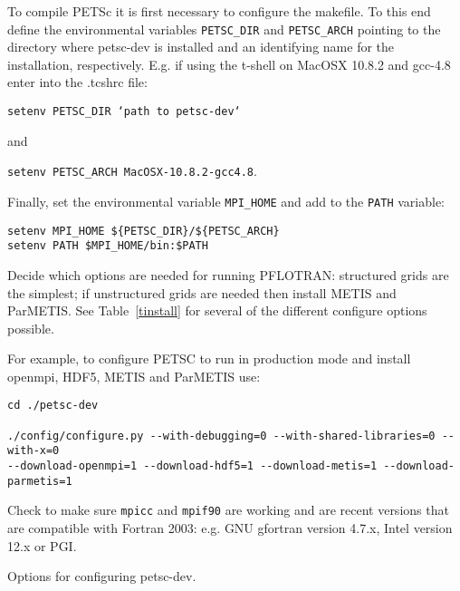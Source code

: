 \begin{description}
To compile PETSc it is first necessary to configure the makefile. To this end define the environmental variables {\footnotesize\tt PETSC\_DIR} and {\footnotesize\tt PETSC\_ARCH} pointing to the directory where petsc-dev is installed and an identifying name for the installation, respectively. E.g. if using the t-shell on MacOSX 10.8.2 and gcc-4.8 enter into the .tcshrc file:

{\footnotesize\tt setenv PETSC\_DIR `path to petsc-dev`}

and

{\footnotesize\tt setenv PETSC\_ARCH MacOSX-10.8.2-gcc4.8}.

Finally, set the environmental variable {\footnotesize\tt MPI\_HOME} and add to the {\footnotesize\tt PATH} variable:
\footnotesize
\begin{Verbatim}
setenv MPI_HOME ${PETSC_DIR}/${PETSC_ARCH}
setenv PATH $MPI_HOME/bin:$PATH
\end{Verbatim}
\normalsize
Decide which options are needed for running PFLOTRAN: structured grids are the simplest; if unstructured grids are needed then install METIS and ParMETIS. See Table~\ref{tinstall} for several of the different configure options possible.

For example, to configure PETSC to run in production mode and install openmpi, HDF5, METIS and ParMETIS use:
\footnotesize
\begin{Verbatim}
cd ./petsc-dev

./config/configure.py --with-debugging=0 --with-shared-libraries=0 --with-x=0 
--download-openmpi=1 --download-hdf5=1 --download-metis=1 --download-parmetis=1
\end{Verbatim}
\normalsize

\noindent
Check to make sure {\footnotesize\tt mpicc} and {\footnotesize\tt mpif90} are working and are recent versions that are compatible with Fortran 2003: e.g. GNU gfortran version 4.7.x, Intel version 12.x or PGI.

\begin{table}[H]\centering
\caption{Options for configuring petsc-dev.}
\label{tinstall}

\vspace{3mm}


\end{table}
\end{description}
